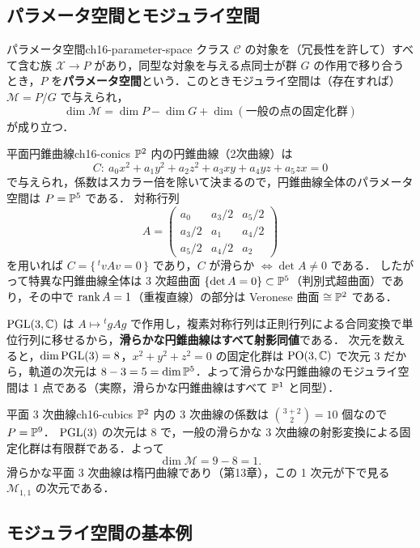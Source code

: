 \subsection{パラメータ空間とモジュライ空間}

\begin{mydef}{パラメータ空間}{ch16-parameter-space}
クラス $\mathcal{C}$ の対象を（冗長性を許して）すべて含む族 $\mathcal{X}\to P$ があり，同型な対象を与える点同士が群 $G$ の作用で移り合うとき，$P$ を\textbf{パラメータ空間}という．このときモジュライ空間は（存在すれば）$\mathcal{M}=P/G$ で与えられ，
\[
\dim\mathcal{M}=\dim P-\dim G+\dim(\text{一般の点の固定化群})
\]
が成り立つ．
\end{mydef}

\begin{myex}{平面円錐曲線}{ch16-conics}
$\mathbb{P}^2$ 内の円錐曲線（2次曲線）は
\[
C:\ a_0x^2+a_1y^2+a_2z^2+a_3xy+a_4yz+a_5zx=0
\]
で与えられ，係数はスカラー倍を除いて決まるので，円錐曲線全体のパラメータ空間は $P=\mathbb{P}^5$ である．
対称行列
\[
A=\begin{pmatrix} a_0 & a_3/2 & a_5/2\\ a_3/2 & a_1 & a_4/2\\ a_5/2 & a_4/2 & a_2\end{pmatrix}
\]
を用いれば $C=\{\,{}^t\!v Av=0\,\}$ であり，$C$ が滑らか $\iff \det A\neq0$ である．
したがって特異な円錐曲線全体は 3 次超曲面 $\{\det A=0\}\subset\mathbb{P}^5$（判別式超曲面）であり，その中で $\operatorname{rank} A=1$（重複直線）の部分は Veronese 曲面 $\cong\mathbb{P}^2$ である．

$\operatorname{PGL}(3,\mathbb{C})$ は $A\mapsto {}^t\!gAg$ で作用し，複素対称行列は正則行列による合同変換で単位行列に移せるから，\textbf{滑らかな円錐曲線はすべて射影同値}である．
次元を数えると，$\dim\operatorname{PGL}(3)=8$，$x^2+y^2+z^2=0$ の固定化群は $\mathrm{PO}(3,\mathbb{C})$ で次元 $3$ だから，軌道の次元は $8-3=5=\dim\mathbb{P}^5$．よって滑らかな円錐曲線のモジュライ空間は 1 点である（実際，滑らかな円錐曲線はすべて $\mathbb{P}^1$ と同型）．
\end{myex}

\begin{myex}{平面 3 次曲線}{ch16-cubics}
$\mathbb{P}^2$ 内の 3 次曲線の係数は $\binom{3+2}{2}=10$ 個なので $P=\mathbb{P}^9$．
$\operatorname{PGL}(3)$ の次元は $8$ で，一般の滑らかな 3 次曲線の射影変換による固定化群は有限群である．よって
\[
\dim\mathcal{M}=9-8=1 .
\]
滑らかな平面 3 次曲線は楕円曲線であり（第13章），この 1 次元が下で見る $\mathcal{M}_{1,1}$ の次元である．
\end{myex}

\subsection{モジュライ空間の基本例}

